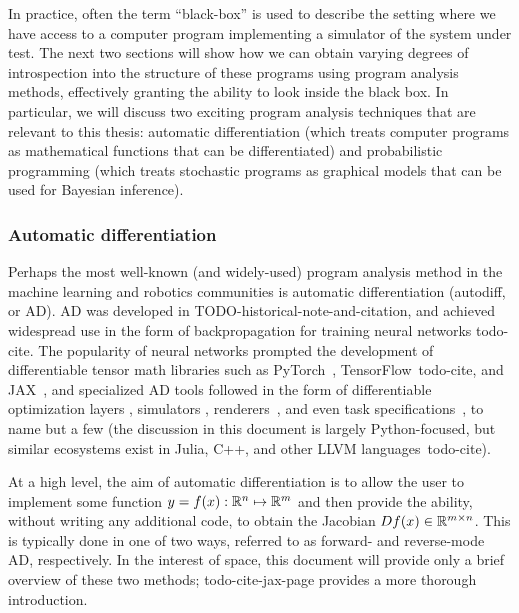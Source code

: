 In practice, often the term ``black-box'' is used to describe the setting where we have access to a computer program implementing a simulator of the system under test. The next two sections will show how we can obtain varying degrees of introspection into the structure of these programs using program analysis methods, effectively granting the ability to look inside the black box. In particular, we will discuss two exciting program analysis techniques that are relevant to this thesis: automatic differentiation (which treats computer programs as mathematical functions that can be differentiated) and probabilistic programming (which treats stochastic programs as graphical models that can be used for Bayesian inference).

\subsubsection{Automatic differentiation}

Perhaps the most well-known (and widely-used) program analysis method in the machine learning and robotics communities is automatic differentiation (autodiff, or AD). AD was developed in TODO-historical-note-and-citation, and achieved widespread use in the form of backpropagation for training neural networks todo-cite. The popularity of neural networks prompted the development of differentiable tensor math libraries such as PyTorch~\cite{paszkePyTorchImperativeStyle2019}, TensorFlow~todo-cite, and JAX~\cite{jax2018github}, and specialized AD tools followed in the form of differentiable optimization layers \cite{agrawalDifferentiableConvexOptimization2019}, simulators \cite{huDiffTaichiDifferentiableProgramming2019}, renderers~\cite{huDiffTaichiDifferentiableProgramming2019,lelidecDifferentiableRenderingPerturbed2021}, and even task specifications~\cite{leungBackPropagationSignalTemporal2021}, to name but a few (the discussion in this document is largely Python-focused, but similar ecosystems exist in Julia, C++, and other LLVM languages~todo-cite).

At a high level, the aim of automatic differentiation is to allow the user to implement some function $y = f(x): \mathbb{R}^n \mapsto \mathbb{R}^m$ and then provide the ability, without writing any additional code, to obtain the Jacobian $Df(x) \in \mathbb{R}^{m\times n}$. This is typically done in one of two ways, referred to as forward- and reverse-mode AD, respectively. In the interest of space, this document will provide only a brief overview of these two methods; todo-cite-jax-page provides a more thorough introduction.

